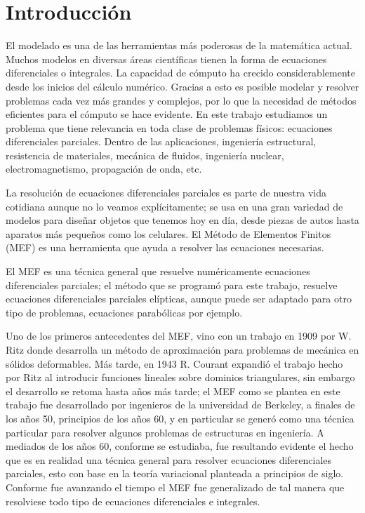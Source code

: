 \documentclass[12pt,spanish,oneside]{book}
\theoremstyle{plain}
\numberwithin{equation}{chapter}
\theoremstyle{definition}
\theoremstyle{remark}
\begin{document}
\frontmatter


\tableofcontents

\mainmatter
\chapter{Introducción}

El modelado es una de las herramientas más poderosas de la matemática actual. Muchos modelos en diversas áreas científicas tienen la forma de ecuaciones diferenciales o integrales. La capacidad de cómputo ha crecido considerablemente desde los inicios del cálculo numérico. Gracias a esto es posible modelar y resolver problemas cada vez más grandes y complejos, por lo que la necesidad de métodos eficientes para el cómputo se hace evidente. En este trabajo estudiamos un problema que tiene relevancia en toda clase de problemas físicos: ecuaciones diferenciales parciales. Dentro de las aplicaciones, ingeniería estructural, resistencia de materiales, mecánica de fluidos, ingeniería nuclear, electromagnetismo, propagación de onda, etc.

La resolución de ecuaciones diferenciales parciales es parte de nuestra vida cotidiana aunque no lo veamos explícitamente; se usa en una gran variedad de modelos para diseñar objetos que tenemos hoy en día, desde piezas de autos hasta aparatos más pequeños como los celulares. El Método de Elementos Finitos (MEF) es una herramienta que ayuda a resolver las ecuaciones necesarias.

El MEF es una técnica general que resuelve numéricamente ecuaciones diferenciales parciales; el método que se programó para este trabajo, resuelve ecuaciones diferenciales parciales elípticas, aunque puede ser adaptado para otro tipo de problemas, ecuaciones parabólicas por ejemplo. 

Uno de los primeros antecedentes del MEF, vino con un trabajo en 1909 por W. Ritz donde desarrolla un método de aproximación para problemas de mecánica en sólidos deformables. Más tarde, en 1943 R. Courant expandió el trabajo hecho por Ritz al introducir funciones lineales sobre dominios triangulares, sin embargo el desarrollo se retoma hasta años más tarde; el MEF como se plantea en este trabajo fue desarrollado por ingenieros de la universidad de Berkeley, a finales de los años 50, principios de los años 60, y en particular se generó como una técnica particular para resolver algunos problemas de estructuras en ingeniería. A mediados de los años 60, conforme se estudiaba, fue resultando evidente el hecho que es en realidad una técnica general para resolver ecuaciones diferenciales parciales, esto con base en la teoría variacional planteada a principios de siglo. Conforme fue avanzando el tiempo el MEF fue generalizado de tal manera que resolviese todo tipo de ecuaciones diferenciales e integrales. 
\end{document}
